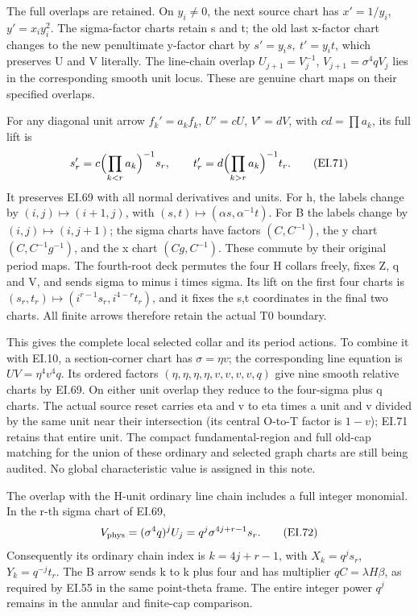 The full overlaps are retained. On \(y_i\ne0\), the next source
chart has \(x'=1/y_i\), \(y'=x_i y_i^2\). The sigma-factor
charts retain s and t; the old last x-factor chart changes to
the new penultimate y-factor chart by
\(s'=y_i s,\ t'=y_i t\), which preserves U and V literally.
The line-chain overlap \(U_{j+1}=V_j^{-1}\),
\(V_{j+1}=\sigma^4q V_j\) lies in the corresponding smooth
unit locus. These are genuine chart maps on their specified
overlaps.

For any diagonal unit arrow \(f_k'=a_kf_k\),
\(U'=cU\), \(V'=dV\), with \(cd=\prod a_k\), its full lift is
\[
 s_r'=c\Bigl(\prod_{k<r}a_k\Bigr)^{-1}s_r,\qquad
 t_r'=d\Bigl(\prod_{k>r}a_k\Bigr)^{-1}t_r.
 \tag{EI.71}
\]
It preserves EI.69 with all normal derivatives and units. For h,
the labels change by \((i,j)\mapsto(i+1,j)\), with
\((s,t)\mapsto(\alpha s,\alpha^{-1}t)\). For B the labels
change by \((i,j)\mapsto(i,j+1)\); the sigma charts have factors
\((C,C^{-1})\), the y chart \((C,C^{-1}g^{-1})\), and the x
chart \((Cg,C^{-1})\). These commute by their original period
maps. The fourth-root deck permutes the four H collars freely,
fixes Z, q and V, and sends sigma to minus i times sigma. Its
lift on the first four charts is
\((s_r,t_r)\mapsto(i^{r-1}s_r,i^{4-r}t_r)\), and it fixes
the s,t coordinates in the final two charts. All finite arrows
therefore retain the actual T0 boundary.

This gives the complete local selected collar and its period
actions. To combine it with EI.10, a section-corner chart has
\(\sigma=\eta v\); the corresponding line equation is
\(UV=\eta^4v^4q\). Its ordered factors
\((\eta,\eta,\eta,\eta,v,v,v,v,q)\) give nine smooth relative
charts by EI.69. On either unit overlap they reduce to the
four-sigma plus q charts. The actual source reset carries eta
and v to eta times a unit and v divided by the same unit near
their intersection (its central O-to-T factor is \(1-v\));
EI.71 retains that entire unit. The compact fundamental-region
and full old-cap matching for the union of these ordinary and
selected graph charts are still being audited. No global
characteristic value is assigned in this note.

The overlap with the H-unit ordinary line chain includes a full
integer monomial. In the r-th sigma chart of EI.69,
\[
 V_{\rm phys}=(\sigma^4q)^jU_j
       =q^j\sigma^{4j+r-1}s_r.
 \tag{EI.72}
\]
Consequently its ordinary chain index is \(k=4j+r-1\), with
\(X_k=q^js_r\), \(Y_k=q^{-j}t_r\). The B arrow sends k
to k plus four and has multiplier \(qC=\lambda H\beta\),
as required by EI.55 in the same point-theta frame. The entire
integer power \(q^j\) remains in the annular and finite-cap
comparison.

